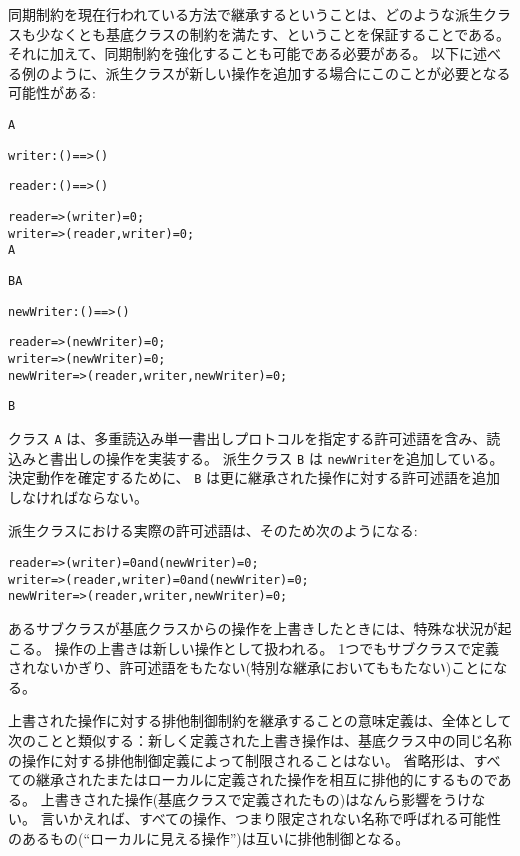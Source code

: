 \documentclass[\pformat,12pt]{jarticle}
\begin{document}
同期制約を現在行われている方法で継承するということは、どのような派生クラスも少なくとも基底クラスの制約を満たす、ということを保証することである。
それに加えて、同期制約を強化することも可能である必要がある。
以下に述べる例のように、派生クラスが新しい操作を追加する場合にこのことが必要となる可能性がある:
\begin{alltt}
   A 
    
      writer: () ==> () 
    
      reader: () ==> () 
    
        reader => (writer) = 0; 
        writer => (reader, writer) = 0; 
   A

   B  A 

      newWriter: () ==> () 

        reader => (newWriter) = 0; 
        writer => (newWriter) = 0; 
        newWriter => (reader, writer, newWriter) = 0; 

   B
\end{alltt}

クラス \texttt{A} は、多重読込み単一書出しプロトコルを指定する許可述語を含み、読込みと書出しの操作を実装する。
派生クラス \texttt{B} は \texttt{newWriter}を追加している。
決定動作を確定するために、 \texttt{B} は更に継承された操作に対する許可述語を追加しなければならない。

派生クラスにおける実際の許可述語は、そのため次のようになる:
\begin{alltt}
   reader => (writer)=0 and (newWriter)=0; 
   writer => (reader, writer)=0 and (newWriter)=0;
   newWriter => (reader, writer, newWriter)=0;
\end{alltt}

あるサブクラスが基底クラスからの操作を上書きしたときには、特殊な状況が起こる。
操作の上書きは新しい操作として扱われる。
1つでもサブクラスで定義されないかぎり、許可述語をもたない(特別な継承においてももたない)ことになる。

上書された操作に対する排他制御制約を継承することの意味定義は、全体として次のことと類似する：新しく定義された上書き操作は、基底クラス中の同じ名称の操作に対する排他制御定義によって制限されることはない。
  省略形は、すべての継承されたまたはローカルに定義された操作を相互に排他的にするものである。
上書きされた操作(基底クラスで定義されたもの)はなんら影響をうけない。 
言いかえれば、すべての操作、つまり限定されない名称で呼ばれる可能性のあるもの(``ローカルに見える操作'')は互いに排他制御となる。
\end{document}
